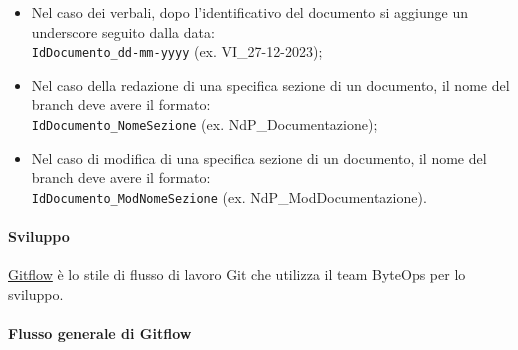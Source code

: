 \begin{itemize}
    \item Nel caso dei verbali, dopo l'identificativo del documento si aggiunge un underscore seguito dalla data: \\
    \texttt{IdDocumento\_dd-mm-yyyy} (ex. VI\_27-12-2023);
    \item Nel caso della redazione di una specifica sezione di un documento, il nome del branch deve avere il formato: \\
    \texttt{IdDocumento\_NomeSezione} (ex. NdP\_Documentazione);
    \item Nel caso di modifica di una specifica sezione di un documento, il nome del branch deve avere il formato: \\
    \texttt{IdDocumento\_ModNomeSezione} (ex. NdP\_ModDocumentazione).
\end{itemize}

\paragraph{Sviluppo}
\href{https://www.atlassian.com/it/git/tutorials/comparing-workflows/gitflow-workflow}{Gitflow} è lo stile di flusso di lavoro Git che utilizza il team ByteOps per lo sviluppo.

\paragraph*{Flusso generale di Gitflow}

